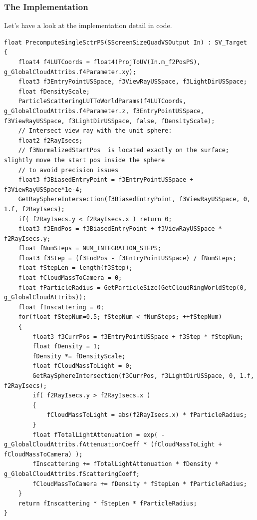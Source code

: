\subsubsection{The Implementation}
Let's have a look at the implementation detail in code.
\begin{lstlisting}
float PrecomputeSingleSctrPS(SScreenSizeQuadVSOutput In) : SV_Target
{
    float4 f4LUTCoords = float4(ProjToUV(In.m_f2PosPS), g_GlobalCloudAttribs.f4Parameter.xy);
    float3 f3EntryPointUSSpace, f3ViewRayUSSpace, f3LightDirUSSpace;
    float fDensityScale;
    ParticleScatteringLUTToWorldParams(f4LUTCoords, g_GlobalCloudAttribs.f4Parameter.z, f3EntryPointUSSpace, f3ViewRayUSSpace, f3LightDirUSSpace, false, fDensityScale);
    // Intersect view ray with the unit sphere:
    float2 f2RayIsecs;
    // f3NormalizedStartPos  is located exactly on the surface; slightly move the start pos inside the sphere
    // to avoid precision issues
    float3 f3BiasedEntryPoint = f3EntryPointUSSpace + f3ViewRayUSSpace*1e-4;
    GetRaySphereIntersection(f3BiasedEntryPoint, f3ViewRayUSSpace, 0, 1.f, f2RayIsecs);
    if( f2RayIsecs.y < f2RayIsecs.x ) return 0;
    float3 f3EndPos = f3BiasedEntryPoint + f3ViewRayUSSpace * f2RayIsecs.y;
    float fNumSteps = NUM_INTEGRATION_STEPS;
    float3 f3Step = (f3EndPos - f3EntryPointUSSpace) / fNumSteps;
    float fStepLen = length(f3Step);
    float fCloudMassToCamera = 0;
    float fParticleRadius = GetParticleSize(GetCloudRingWorldStep(0, g_GlobalCloudAttribs));
    float fInscattering = 0;
    for(float fStepNum=0.5; fStepNum < fNumSteps; ++fStepNum)
    {
        float3 f3CurrPos = f3EntryPointUSSpace + f3Step * fStepNum;
        float fDensity = 1;
        fDensity *= fDensityScale;
        float fCloudMassToLight = 0;
        GetRaySphereIntersection(f3CurrPos, f3LightDirUSSpace, 0, 1.f, f2RayIsecs);
        if( f2RayIsecs.y > f2RayIsecs.x )
        {
            fCloudMassToLight = abs(f2RayIsecs.x) * fParticleRadius;
        }
        float fTotalLightAttenuation = exp( -g_GlobalCloudAttribs.fAttenuationCoeff * (fCloudMassToLight + fCloudMassToCamera) );
        fInscattering += fTotalLightAttenuation * fDensity * g_GlobalCloudAttribs.fScatteringCoeff;
        fCloudMassToCamera += fDensity * fStepLen * fParticleRadius;
    }
    return fInscattering * fStepLen * fParticleRadius;
}
\end{lstlisting}


